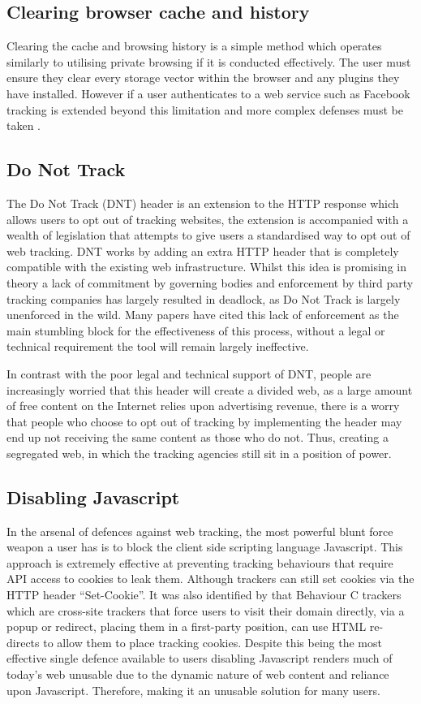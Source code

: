 \documentclass[12pt]{article}
\begin{document}
\subsection{Clearing browser cache and history}
Clearing the cache and browsing history is a simple method which operates similarly to utilising private browsing if it is conducted effectively. The user must ensure they clear every storage vector within the browser and any plugins they have installed. However if a user authenticates to a web service such as Facebook tracking is extended beyond this limitation and more complex defenses must be taken \parencite{bujlow2015web}. 

\subsection{Do Not Track}
The Do Not Track (DNT) header is an extension to the HTTP response which allows users to opt out of tracking websites, the extension is accompanied with a wealth of legislation that attempts to give users a standardised way to opt out of web tracking. DNT works by adding an extra HTTP header that is completely compatible with the existing web infrastructure. Whilst this idea is promising in theory a lack of commitment by governing bodies and enforcement by third party tracking companies has largely resulted in deadlock, as Do Not Track is largely unenforced in the wild. Many papers have cited this lack of enforcement as the main stumbling block for the effectiveness of this process, without a legal or technical requirement the tool will remain largely ineffective. \newline

In contrast with the poor legal and technical support of DNT, people are increasingly worried that this header will create a divided web, as a large amount of free content on the Internet relies upon advertising revenue, there is a worry that people who choose to opt out of tracking by implementing the header may end up not receiving the same content as those who do not. Thus, creating a segregated web, in which the tracking agencies still sit in a position of power. 

\subsection{Disabling Javascript}
In the arsenal of defences against web tracking, the most powerful blunt force weapon a user has is to block the client side scripting language Javascript. This approach is extremely effective at preventing tracking behaviours that require API access to cookies to leak them. Although trackers can still set cookies via the HTTP header  ``Set-Cookie''. It was also identified by \parencite{roesner} that Behaviour C trackers which are cross-site trackers that force users to visit their domain directly, via a popup or redirect, placing them in a first-party position, can use HTML re-directs to allow them to place tracking cookies. Despite this being the most effective single defence available to users disabling Javascript renders much of today's web unusable due to the dynamic nature of web content and reliance upon Javascript. Therefore, making it an unusable solution for many users. 
\end{document}
